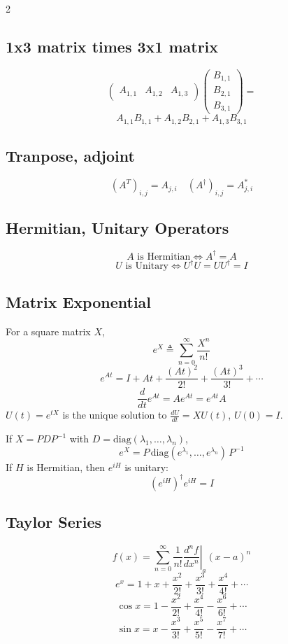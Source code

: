 \documentclass[
]{article}
\begin{document}
\begin{multicols}{2}
	\subsection*	{1x3 matrix times 3x1 matrix}
	\[
		\begin{pmatrix} A_{1,1} & A_{1,2} & A_{1,3} \end{pmatrix} \begin{pmatrix} B_{1,1} \\ B_{2,1} \\ B_{3,1} \end{pmatrix} =
	\]
	\[
		A_{1,1}B_{1,1} + A_{1,2}B_{2,1} + A_{1,3}B_{3,1}
	\]
	\subsection*{Tranpose, adjoint}
	\[
		(A^T)_{i,j} = A_{j,i}
		\quad
		(A^\dagger)_{i,j} = A^*_{j,i}
	\]

	\subsection*{Hermitian, Unitary Operators}
	\[
		A \text{ is Hermitian} \iff A^\dagger = A
	\]
	\[
		U \text{ is Unitary} \iff U^\dagger U = U U^\dagger = I
	\]

	\subsection*{Matrix Exponential}
	For a square matrix $X$,
	\[
		e^X \triangleq \sum_{n=0}^{\infty} \frac{X^n}{n!}
	\]
	\[
		e^{At} = I + At + \frac{(At)^2}{2!} + \frac{(At)^3}{3!} + \cdots
	\]
	\[
		\frac{d}{dt} e^{At} = A e^{At} = e^{At} A
	\]
	$U(t)=e^{tX}$ is the unique solution to $\frac{dU}{dt}=XU(t)$, $U(0)=I$.

	If $X = PDP^{-1}$ with $D=\mathrm{diag}(\lambda_1,\dots,\lambda_n)$,
	\[
		e^X = P\,\mathrm{diag}(e^{\lambda_1},\dots,e^{\lambda_n})\,P^{-1}
	\]
	If $H$ is Hermitian, then $e^{iH}$ is unitary:
	\[
		(e^{iH})^\dagger e^{iH} = I
	\]
	\subsection*{Taylor Series}
	\[
		f(x) = \sum_{n=0}^{\infty} \frac{1}{n!}\left.\frac{d^n f}{dx^n}\right|_a (x-a)^n
	\]
	\[
		e^x = 1 + x + \frac{x^2}{2!} + \frac{x^3}{3!} + \frac{x^4}{4!} + \cdots
	\]
	\[
		\cos x = 1 - \frac{x^2}{2!} + \frac{x^4}{4!} - \frac{x^6}{6!} + \cdots
	\]
	\[
		\sin x = x - \frac{x^3}{3!} + \frac{x^5}{5!} - \frac{x^7}{7!} + \cdots
	\]


\end{multicols}
\end{document}

